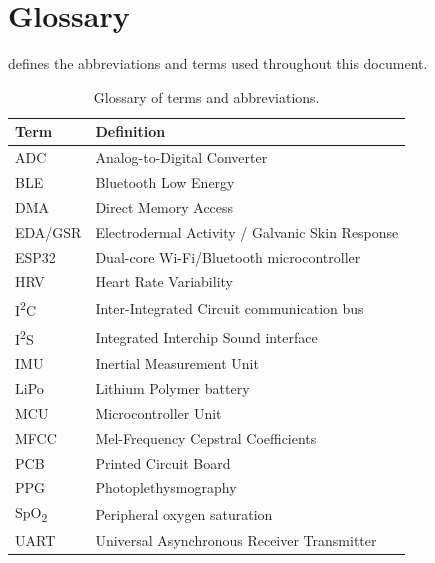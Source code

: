 \section{Glossary}
\label{sec:glossary}

 defines the abbreviations and terms used throughout this document.

\begin{table}[t]
\centering
\caption{Glossary of terms and abbreviations.}
\label{tab:glossary}
\small
\begin{tabularx}{\textwidth}{@{}l Y@{}}
\toprule
\textbf{Term} & \textbf{Definition} \\
\midrule
ADC & Analog-to-Digital Converter \\
BLE & Bluetooth Low Energy \\
DMA & Direct Memory Access \\
EDA/GSR & Electrodermal Activity / Galvanic Skin Response \\
ESP32 & Dual-core Wi-Fi/Bluetooth microcontroller \\
HRV & Heart Rate Variability \\
I\textsuperscript{2}C & Inter-Integrated Circuit communication bus \\
I\textsuperscript{2}S & Integrated Interchip Sound interface \\
IMU & Inertial Measurement Unit \\
LiPo & Lithium Polymer battery \\
MCU & Microcontroller Unit \\
MFCC & Mel-Frequency Cepstral Coefficients \\
PCB & Printed Circuit Board \\
PPG & Photoplethysmography \\
SpO\textsubscript{2} & Peripheral oxygen saturation \\
UART & Universal Asynchronous Receiver Transmitter \\
\bottomrule
\end{tabularx}
\end{table}
